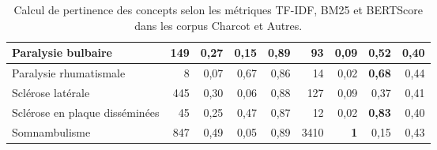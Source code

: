 \begin{landscape}
\begin{table}[]
\begin{tabular}{|l|cccc|cccc|}
Paralysie bulbaire                                     & \multicolumn{1}{r|}{149}         & \multicolumn{1}{r|}{0,27}   & \multicolumn{1}{r|}{0,15} & \multicolumn{1}{r|}{0,89}     & \multicolumn{1}{r|}{93}         & \multicolumn{1}{r|}{0,09}   & \multicolumn{1}{r|}{0,52} & \multicolumn{1}{r|}{0,40}      \\ \hline
Paralysie rhumatismale                                 & \multicolumn{1}{r|}{8}         & \multicolumn{1}{r|}{0,07}      & \multicolumn{1}{r|}{0,67}    & \multicolumn{1}{r|}{0,86}         & \multicolumn{1}{r|}{14}         & \multicolumn{1}{r|}{0,02}   & \multicolumn{1}{r|}{\textbf{0,68}} & \multicolumn{1}{r|}{0,44}      \\ \hline
Sclérose latérale                                      & \multicolumn{1}{r|}{445}        & \multicolumn{1}{r|}{0,30}   & \multicolumn{1}{r|}{0,06} & \multicolumn{1}{r|}{0,88}      & \multicolumn{1}{r|}{127}         & \multicolumn{1}{r|}{0,09}   & \multicolumn{1}{r|}{0,37} & \multicolumn{1}{r|}{0,41}      \\ \hline
Sclérose en plaque disséminées                         & \multicolumn{1}{r|}{45}         & \multicolumn{1}{r|}{0,25}   & \multicolumn{1}{r|}{0,47} & \multicolumn{1}{r|}{0,87}      & \multicolumn{1}{r|}{12}         & \multicolumn{1}{r|}{0,02}   & \multicolumn{1}{r|}{\textbf{0,83}}    & \multicolumn{1}{r|}{0,40}      \\ \hline
Somnambulisme                                          & \multicolumn{1}{r|}{847}        & \multicolumn{1}{r|}{0,49}   & \multicolumn{1}{r|}{0,05} & \multicolumn{1}{r|}{0,89}      & \multicolumn{1}{r|}{3410}       & \multicolumn{1}{r|}{\textbf{1}}   & \multicolumn{1}{r|}{0,15} & \multicolumn{1}{r|}{0,43}      \\ \hline
\end{tabular}
\caption{Calcul de pertinence des concepts selon les métriques TF-IDF, BM25 et BERTScore dans les corpus \og{}Charcot\fg{} et \og{}Autres\fg{}.}
\label{table:concepts}
\end{table}
\end{landscape}


